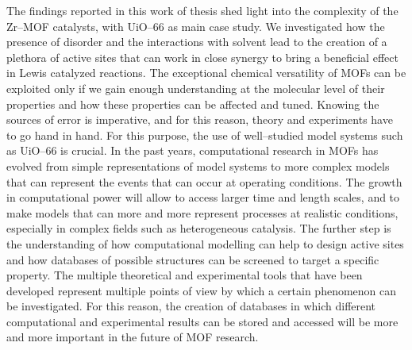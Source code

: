 The findings reported in this work of thesis shed light into the complexity of the Zr--MOF catalysts, with UiO--66 as main case study. We investigated how the presence of disorder and the interactions with solvent lead to the creation of a plethora of active sites that can work in close synergy to bring a beneficial effect in Lewis catalyzed reactions. The exceptional chemical versatility of MOFs can be exploited only if we gain enough understanding at the molecular level of their properties and how these properties can be affected and tuned. Knowing the sources of error is imperative, and for this reason, theory and experiments have to go hand in hand. For this purpose, the use of well--studied model systems such as UiO--66 is crucial. In the past years, computational research in MOFs has evolved from simple representations of model systems to more complex models that can represent the events that can occur at operating conditions. The growth in computational power will allow to access larger time and length scales, and to make models that can more and more represent processes at realistic conditions, especially in complex fields such as heterogeneous catalysis. The further step is the understanding of how computational modelling can help to design active sites and how databases of possible structures can be screened to target a specific property. The multiple theoretical and experimental tools that have been developed represent multiple points of view by which a certain phenomenon can be investigated. For this reason, the creation of databases in which different computational and experimental results can be stored and accessed will be more and more important in the future of MOF research. 

